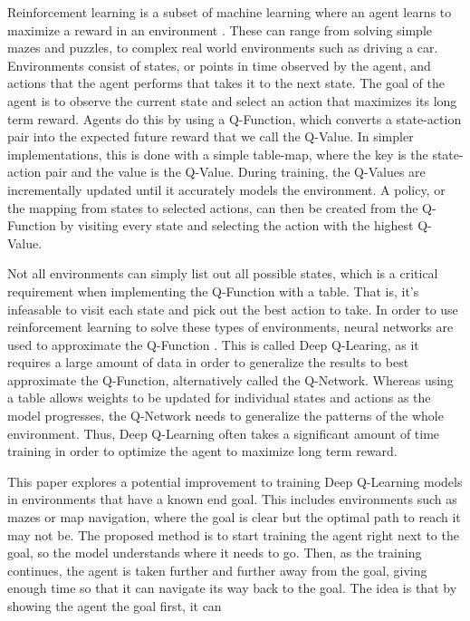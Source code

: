 \documentclass[12pt]{article}
\begin{document}
Reinforcement learning is a subset of machine learning where an agent learns to maximize a reward in an environment \cite{article_reinforcement_learning_survey}.
These can range from solving simple mazes and puzzles, to complex real world environments such as driving a car.
Environments consist of states, or points in time observed by the agent, and actions that the agent performs that takes it to the next state.
The goal of the agent is to observe the current state and select an action that maximizes its long term reward.
Agents do this by using a Q-Function, which converts a state-action pair into the expected future reward that we call the Q-Value.
In simpler implementations, this is done with a simple table-map, where the key is the state-action pair and the value is the Q-Value.
During training, the Q-Values are incrementally updated until it accurately models the environment.
A policy, or the mapping from states to selected actions, can then be created from the Q-Function by visiting every state and selecting the action with the highest Q-Value.

Not all environments can simply list out all possible states, which is a critical requirement when implementing the Q-Function with a table.
That is, it's infeasable to visit each state and pick out the best action to take.
In order to use reinforcement learning to solve these types of environments, neural networks are used to approximate the Q-Function \cite{article_reinforcement_learning_for_robots}.
This is called Deep Q-Learing, as it requires a large amount of data in order to generalize the results to best approximate the Q-Function, alternatively called the Q-Network.
Whereas using a table allows weights to be updated for individual states and actions as the model progresses, the Q-Network needs to generalize the patterns of the whole environment.
Thus, Deep Q-Learning often takes a significant amount of time training in order to optimize the agent to maximize long term reward.

This paper explores a potential improvement to training Deep Q-Learning models in environments that have a known end goal.
This includes environments such as mazes or map navigation, where the goal is clear but the optimal path to reach it may not be.
The proposed method is to start training the agent right next to the goal, so the model understands where it needs to go.
Then, as the training continues, the agent is taken further and further away from the goal, giving enough time so that it can navigate its way back to the goal.
The idea is that by showing the agent the goal first, it can 
\end{document}
